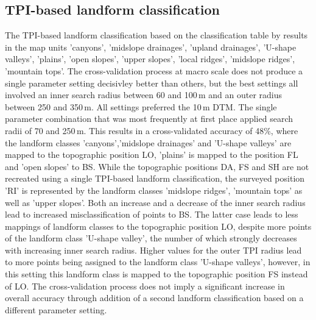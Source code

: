 \documentclass[preprint,12pt,authoryear]{elsarticle}
\begin{document}
\subsection{TPI-based landform classification}
The TPI-based landform classification based on the  classification table by \cite{Weiss2000} results in the map units 'canyons', 'midslope drainages', 'upland drainages', 'U-shape valleys', 'plains', 'open slopes', 'upper slopes', 'local ridges', 'midslope ridges', 'mountain tops'. The cross-validation process at macro scale does not produce a single parameter setting decisivley better than others, but the best settings all involved an inner search radius between 60 and 100\,m and an outer radius between 250  and 350\,m. All settings preferred the 10\,m DTM. The single parameter combination that was most frequently at first place applied search radii of 70 and 250\,m. This results in a cross-validated accuracy of 48\%, where the landform classes 'canyons','midslope drainages' and 'U-shape valleys' are mapped to the topographic position LO, 'plains' is mapped to the position FL and 'open slopes' to BS. While the topographic positions DA, FS and SH are not recreated using a single TPI-based landform classification, the surveyed position 'RI' is represented by the landform classes 'midslope ridges', 'mountain tops' as well as 'upper slopes'. Both an increase and a decrease of the inner search radius lead to increased misclassification of points to BS. The latter case leads to less mappings of landform classes to the topographic position LO, despite more points of the landform class 'U-shape valley', the number of which strongly decreases with increasing inner search radius. Higher values for the outer TPI radius lead to more points being assigned to the landform class 'U-shape valleys', however, in this setting this landform class is mapped to the topographic position FS instead of LO. The cross-validation process does not imply a significant increase in overall accuracy through addition of a second landform classification based on a different parameter setting.   
\end{document}
